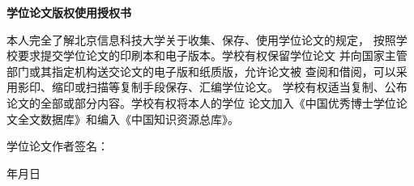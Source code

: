 
\clearpage
\thispagestyle{empty}

\begingroup

\songti
\fontsize{14bp}{24bp}\selectfont
\setlength{\parindent}{2em}
\setlength{\parskip}{0bp}

\begin{center}
{\heiti\bfseries\fontsize{18bp}{27bp}\selectfont
学位论文版权使用授权书
\par}
\end{center}

\vspace{0.65cm}

本人完全了解北京信息科技大学关于收集、保存、使用学位论文的规定，
按照学校要求提交学位论文的印刷本和电子版本。学校有权保留学位论文
并向国家主管部门或其指定机构送交论文的电子版和纸质版，允许论文被
查阅和借阅，可以采用影印、缩印或扫描等复制手段保存、汇编学位论文。
学校有权适当复制、公布论文的全部或部分内容。学校有权将本人的学位
论文加入《中国优秀博士学位论文全文数据库》和编入《中国知识资源总库》。

\vspace{0.65cm}

\noindent
\hfill
学位论文作者签名：\hspace{2.3cm}

\par
\vspace{0.05cm}

\noindent
\hfill
年\hspace{1.5em}月\hspace{1.5em}日
\hspace{1.1cm}

\vspace{0.30cm}

